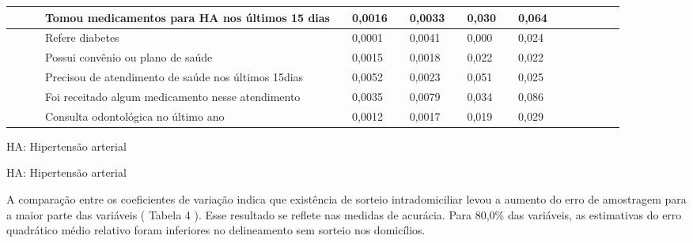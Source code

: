 \documentclass{article}
\begin{document}
\begin{tabular}{| l | l | l | l | l | l || l | l | l | l || l | l | l | l | l | l | l | l |}
 & 
 & %
 & Tomou medicamentos para HA nos últimos 15 dias
 & %
 & 0,0016
 & %
 & 0,0033
 & %
 & 0,030
 & %
 & 0,064
\\ \hline 

 & 
 & %
 & Refere diabetes
 & %
 & 0,0001
 & %
 & 0,0041
 & %
 & 0,000
 & %
 & 0,024
\\ \hline 

 & 
 & %
 & Possui convênio ou plano de saúde
 & %
 & 0,0015
 & %
 & 0,0018
 & %
 & 0,022
 & %
 & 0,022
\\ \hline 

 & 
 & %
 & Precisou de atendimento de saúde nos últimos 15dias
 & %
 & 0,0052
 & %
 & 0,0023
 & %
 & 0,051
 & %
 & 0,025
\\ \hline 

 & 
 & %
 & Foi receitado algum medicamento nesse atendimento
 & %
 & 0,0035
 & %
 & 0,0079
 & %
 & 0,034
 & %
 & 0,086
\\ \hline 

 & 
 & %
 & Consulta odontológica no último ano
 & %
 & 0,0012
 & %
 & 0,0017
 & %
 & 0,019
 & %
 & 0,029
\\ \hline 


\end{tabular}

HA: Hipertensão arterial


HA: Hipertensão arterial

A comparação entre os coeficientes de variação indica que existência de sorteio intradomiciliar levou a aumento do erro de amostragem para a maior parte das variáveis (%
Tabela 4%
). Esse resultado se reflete nas medidas de acurácia. Para 80,0\% das variáveis, as estimativas do erro quadrático médio relativo foram inferiores no delineamento sem sorteio nos domicílios.
\end{document}
